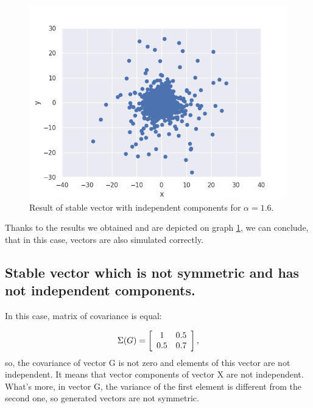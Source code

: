 \documentclass{article}
\begin{document}
	\begin{figure}[H]
		\centering
		\includegraphics[width=1\linewidth]{images/ex_1_b_alpha_stable_vector_simulation_symmetric_continous_scatter}
		\caption{Result of stable vector with independent components for $\alpha=1.6$.}\label{2}
	\end{figure}
	Thanks to the results we obtained and are depicted on graph \ref{2}, we can conclude, that in this case, vectors are also simulated correctly.
	
	\subsection{Stable vector which is not symmetric and has not independent components.}
	
	In this case, matrix of covariance is equal:
	
	\[\Sigma(G) = \left[{\begin{array}{*{20}c}
			1 & 0.5\\
			0.5 & 0.7\end{array} } \right],\]
	so, the covariance of vector G is not zero and elements of this vector are not independent. It means that vector components of vector X are not independent. What's more, in vector G, the variance of the first element is different from the second one, so generated vectors are not symmetric.
	
\end{document}
